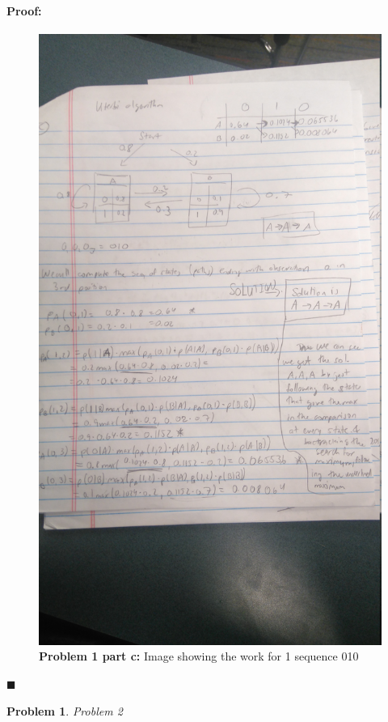 \documentclass[12pt]{article}
\newenvironment{proof}{\paragraph{Proof: }}{\hfill$\blacksquare$}
\newtheorem{problem}{Problem}%
\begin{document}
\begin{proof}
\begin{figure}[!htbp]
\centering
\includegraphics[width = 13cm]{hw6_1c.jpg}
\caption{\textbf{Problem 1 part c:} Image showing the work for 1 sequence 010}
\end{figure}

\end{proof}

\newpage
\begin{problem}
\normalfont 
Problem 2
\end{problem}
\end{document}
